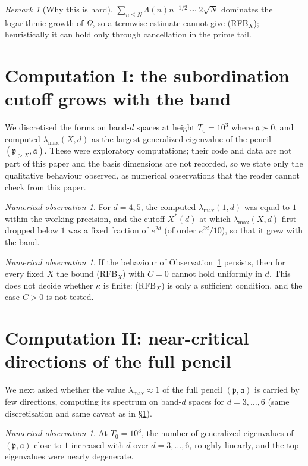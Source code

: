 \documentclass[11pt]{amsart}
\theoremstyle{definition}
\theoremstyle{remark}
\newtheorem{remark}[theorem]{Remark}
\newtheorem{observation}[theorem]{Numerical observation}
\newcommand{\fa}{\mathfrak a}
\newcommand{\fp}{\mathfrak p}
\begin{document}
\begin{remark}[Why this is hard]
$\sum_{n\le N}\Lambda(n)n^{-1/2}\sim2\sqrt N$ dominates the logarithmic growth
of $\Omega$, so a termwise estimate cannot give (RFB$_X$); heuristically it can hold
only through cancellation in the prime tail.
\end{remark}

\section{Computation I: the subordination cutoff grows with the
band}\label{sec:c1}
We discretised the forms on band-$d$ spaces at height $T_0=10^3$ where
$\fa\succ0$, and computed $\lambda_{\max}(X,d)$ as the largest generalized
eigenvalue of the pencil $(\fp_{>X},\fa)$. These were exploratory computations;
their code and data are not part of this paper and the basis dimensions are not
recorded, so we state only the qualitative behaviour observed, as numerical
observations that the reader cannot check from this paper.

\begin{observation}\label{obs:c1}
For $d=4,5$, the computed $\lambda_{\max}(1,d)$ was equal to $1$ within the
working precision, and the cutoff $X^\ast(d)$ at which $\lambda_{\max}(X,d)$
first dropped below $1$ was a fixed fraction of $e^{2d}$ (of order $e^{2d}/10$),
so that it grew with the band.
\end{observation}

\begin{observation}\label{cor:c1}
If the behaviour of Observation~\ref{obs:c1} persists, then for every fixed $X$
the bound (RFB$_X$) with $C=0$ cannot hold uniformly in $d$. This does not
decide whether $\kappa$ is finite: (RFB$_X$) is only a sufficient condition,
and the case $C>0$ is not tested.
\end{observation}

\section{Computation II: near-critical directions of the full
pencil}\label{sec:c2}
We next asked whether the value $\lambda_{\max}\approx1$ of the full pencil
$(\fp,\fa)$ is carried by few directions, computing its spectrum on band-$d$
spaces for $d=3,\dots,6$ (same discretisation and same caveat as in
\S\ref{sec:c1}).

\begin{observation}\label{obs:c2}
At $T_0=10^3$, the number of generalized eigenvalues of $(\fp,\fa)$ close to
$1$ increased with $d$ over $d=3,\dots,6$, roughly linearly, and the top
eigenvalues were nearly degenerate.
\end{observation}
\end{document}

